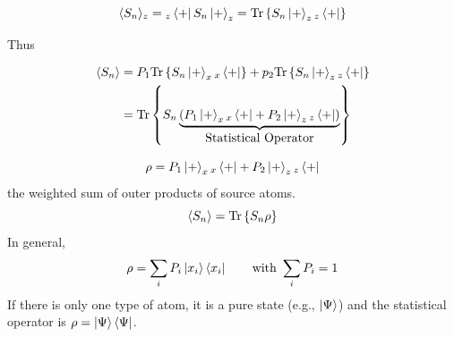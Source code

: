 \documentclass[english, 11pt]{article}
\begin{document}
      \[ \E{S_n}_z = {}_z\bp S_n\kp_z = \tr{S_n\kp_z {}_z\bp} \]

      Thus

      \begin{align*}
        \E{S_n} & = P_1\tr{S_n\kp_x {}_x\bp} + p_2\tr{S_n\kp_z {}_z\bp} \\
                & = \tr{S_n \underbrace{\left( P_1\kp_x{}_x\bp + P_2\kp_z{}_z\bp \right)}_{\mbox{Statistical Operator}}}
      \end{align*}

      \begin{defn}\label{statistical_operator}
        \[ \rho = P_1\kp_x {}_x\bp + P_2\kp_z {}_z\bp \]
        the weighted sum of outer products of source atoms.
        \[ \E{S_n} = \tr{S_n\rho} \]
        In general,
        \[ \rho = \sum_i P_i \ket{x_i}\bra{x_i} \ \ \ \ \ \ \mbox{with } \sum_i P_i = 1 \]
        If there is only one type of atom, it is a pure state (e.g., $\kpsi$) and the statistical operator is $\rho = \kpsi\bra{\Psi}$.
      \end{defn}

\end{document}
